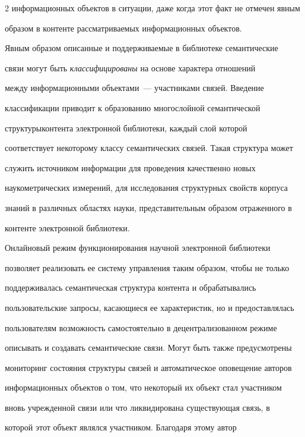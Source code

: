 \begin{multicols}{2}
информационных объектов в ситуации, даже когда этот факт не отмечен явным 


образом в контенте рассматриваемых информационных объектов. 


  


  Явным образом описанные и поддерживаемые в библиотеке семантические 


связи могут быть \textit{классифицированы} на основе характера отношений 


между информационными объектами~--- участниками связей. Введение 


классификации приводит к образованию многослойной семантической 


структуры\linebreak контента электронной библиотеки, каждый слой которой 


соответствует некоторому классу семантических связей. Такая структура может 


служить источни\-ком информации для проведения качественно новых 


наукометрических измерений, для исследования структурных свойств корпуса 


знаний в различных областях науки, представительным образом отраженного в 


контенте электронной библиотеки. 


  


  Онлайновый режим функционирования научной электронной библиотеки 


позволяет реализовать ее систему управления таким образом, чтобы не только 


поддерживалась семантическая структура контента и обрабатывались 


пользовательские запросы, касающиеся ее характеристик, но и предостав\-лялась 


пользователям возможность самостоятельно в децентрализованном режиме 


описывать и создавать семантические связи. Могут быть также предусмотрены 


мониторинг состояния структуры связей и автоматическое оповещение авторов 


информационных объектов о том, что некоторый их объект стал участником 


вновь учрежденной связи или что ликвидирована существующая связь, в 


которой этот объект являлся участником. Благодаря этому автор 



\end{multicols}
